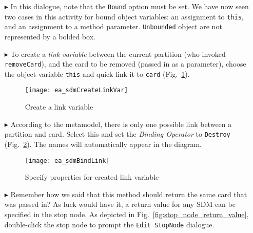 \begin{itemize}
\item[$\blacktriangleright$] In this dialogue, note that the \texttt{Bound} option must be set. We have now seen two cases in this activity for bound object
variables: an assignment to \texttt{this}, and an assignment to a method parameter. \texttt{Unbounded} object are not represented by a bolded box.

\vspace{0.5cm}

\item[$\blacktriangleright$] To create a \emph{link variable} between the current partition (who invoked \texttt{removeCard}), and the
card to be removed (passed in as a parameter), choose the object variable \texttt{this} and quick-link it to \texttt{card}
(Fig.~\ref{fig:link_variable}).

\begin{figure}[htpb]
\begin{center}
  \texttt{[image: ea\_sdmCreateLinkVar]}
  \caption{Create a link variable}   
  \label{fig:link_variable}
\end{center}
\end{figure}

\item[$\blacktriangleright$] According to the metamodel, there is only one possible link between a partition and card. Select this and set the
\emph{Binding Operator} to \texttt{Destroy} (Fig.~\ref{fig:link_variable_properties}). The names will automatically appear in the diagram.

\vspace{0.5cm}

\begin{figure}[h!]
\begin{center} 
 \texttt{[image: ea\_sdmBindLink]}
  \caption{Specify properties for created link variable}  
  \label{fig:link_variable_properties}
\end{center}
\end{figure}

\vspace{0.5cm}

\item[$\blacktriangleright$] Remember how we said that this method should return the same card that was passed in? As luck would have it, a return value for any
SDM can be specified in the stop node. As depicted in Fig.~\ref{fig:stop_node_return_value}, double-click the stop node to prompt the \texttt{Edit StopNode} dialogue. 


\end{itemize}
